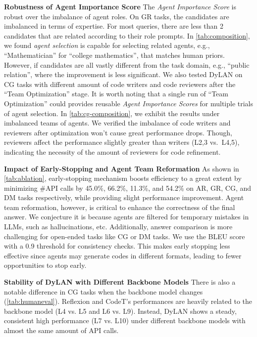 \documentclass{article} %
\begin{document}
\noindent
\textbf{Robustness of Agent Importance Score}
The \textit{Agent Importance Score} is robust over the imbalance of agent roles.
On GR tasks, the candidates are imbalanced in terms of expertise. For most queries, there are less than 2 candidates that are related according to their role prompts. In \cref{tab:composition}, we found \textit{agent selection} is capable for selecting related agents, e.g., ``Mathematician'' for ``college mathematics'', that matches human priors. However, if candidates are all vastly different from the task domain, e.g., ``public relation'', where the improvement is less significant. We also tested DyLAN on CG tasks with different amount of code writers and code reviewers after the ``Team Optimization'' stage. It is worth noting that a single run of ``Team Optimization'' could provides reusable \textit{Agent Importance Scores} for multiple trials of agent selection. In \cref{tab:cg-composition}, we exhibit the results under imbalanced teams of agents. We verified the imbalance of code writers and reviewers after optimization won't cause great performance drops. Though, reviewers affect the performance slightly greater than writers (L2,3 vs.~L4,5), indicating the necessity of the amount of reviewers for code refinement. 



\noindent
\textbf{Impact of Early-Stopping and Agent Team Reformation}
As shown in \cref{tab:ablation}, early-stopping mechanism boosts efficiency to a great extent by minimizing \#API calls by \textcolor{mydarkgreen}{45.0\%}, \textcolor{mydarkgreen}{66.2\%}, \textcolor{mydarkgreen}{11.3\%},  and \textcolor{mydarkgreen}{54.2\%} on AR, GR, CG, and DM tasks respectively, while providing slight performance improvement. Agent team reformation, however, is critical to enhance the correctness of the final answer. We conjecture it is because agents are filtered for temporary mistakes in LLMs, such as hallucinations, etc. Additionally, answer comparison is more challenging for open-ended tasks like CG or DM tasks. We use the BLEU score with a 0.9 threshold for consistency checks. This makes early stopping less effective since agents may generate codes in different formats, leading to fewer opportunities to stop early.


\noindent
\textbf{Stability of DyLAN with Different Backbone Models}
There is also a notable difference in CG tasks when the backbone model changes (\cref{tab:humaneval}). Reflexion and CodeT's performances are heavily related to the backbone model (L4 vs. L5 and L6 vs. L9). 
Instead, DyLAN shows a steady, consistent high performance (L7 vs. L10) under different backbone models with almost the same amount of API calls.
\end{document}
